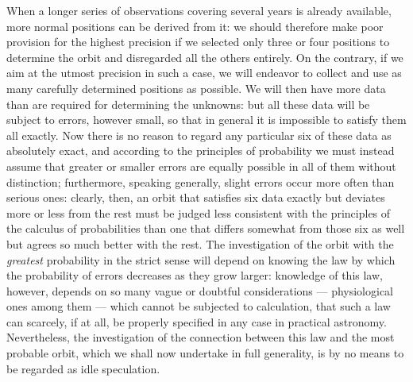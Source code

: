 When a longer series of observations covering several years is already available, more normal positions can be derived from it: we should therefore make poor provision for the highest precision if we selected only three or four positions to determine the orbit and disregarded all the others entirely. On the contrary, if we aim at the utmost precision in such a case, we will endeavor to collect and use as many carefully determined positions as possible. We will then have more data than are required for determining the unknowns: but all these data will be subject to errors, however small, so that in general it is impossible to satisfy them all exactly. Now there is no reason to regard any particular six of these data as absolutely exact, and according to the principles of probability we must instead assume that greater or smaller errors are equally possible in all of them without distinction; furthermore, speaking generally, slight errors occur more often than serious ones: clearly, then, an orbit that satisfies six data exactly but deviates more or less from the rest must be judged less consistent with the principles of the calculus of probabilities than one that differs somewhat from those six as well but agrees so much better with the rest. The investigation of the orbit with the \emph{greatest} probability in the strict sense will depend on knowing the law by which the probability of errors decreases as they grow larger: knowledge of this law, however, depends on so many vague or doubtful considerations --- physiological ones among them --- which cannot be subjected to calculation, that such a law can scarcely, if at all, be properly specified in any case in practical astronomy. Nevertheless, the investigation of the connection between this law and the most probable orbit, which we shall now undertake in full generality, is by no means to be regarded as idle speculation.
